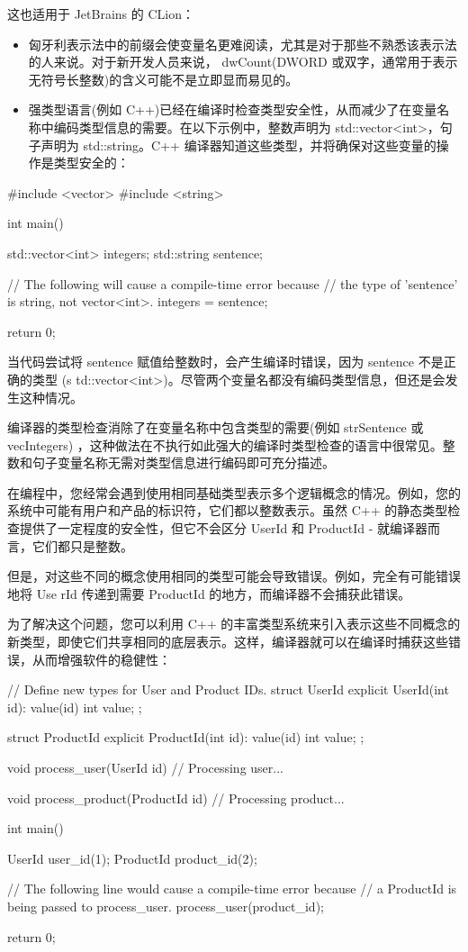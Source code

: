 这也适用于 JetBrains 的 CLion：

\begin{itemize}
\item
匈牙利表示法中的前缀会使变量名更难阅读，尤其是对于那些不熟悉该表示法的人来说。对于新开发人员来说， dwCount(DWORD 或双字，通常用于表示无符号长整数)的含义可能不是立即显而易见的。

\item
强类型语言(例如 C++)已经在编译时检查类型安全性，从而减少了在变量名称中编码类型信息的需要。在以下示例中，整数声明为 std::vector<int>，句子声明为 std::string。C++ 编译器知道这些类型，并将确保对这些变量的操作是类型安全的：
\end{itemize}

\begin{cpp}
#include <vector>
#include <string>

int main() {
    std::vector<int> integers;
    std::string sentence;

    // The following will cause a compile-time error because
    // the type of 'sentence' is string, not vector<int>.
    integers = sentence;

    return 0;
}
\end{cpp}

当代码尝试将 sentence 赋值给整数时，会产生编译时错误，因为 sentence 不是正确的类型 (s td::vector<int>)。尽管两个变量名都没有编码类型信息，但还是会发生这种情况。

编译器的类型检查消除了在变量名称中包含类型的需要(例如 strSentence 或 vecIntegers) ，这种做法在不执行如此强大的编译时类型检查的语言中很常见。整数和句子变量名称无需对类型信息进行编码即可充分描述。

在编程中，您经常会遇到使用相同基础类型表示多个逻辑概念的情况。例如，您的系统中可能有用户和产品的标识符，它们都以整数表示。虽然 C++ 的静态类型检查提供了一定程度的安全性，但它不会区分 UserId 和 ProductId - 就编译器而言，它们都只是整数。

但是，对这些不同的概念使用相同的类型可能会导致错误。例如，完全有可能错误地将 Use rId 传递到需要 ProductId 的地方，而编译器不会捕获此错误。

为了解决这个问题，您可以利用 C++ 的丰富类型系统来引入表示这些不同概念的新类型，即使它们共享相同的底层表示。这样，编译器就可以在编译时捕获这些错误，从而增强软件的稳健性：

\begin{cpp}
// Define new types for User and Product IDs.
struct UserId {
    explicit UserId(int id): value(id) {}
    int value;
};

struct ProductId {
    explicit ProductId(int id): value(id) {}
    int value;
};

void process_user(UserId id) {
    // Processing user...
}

void process_product(ProductId id) {
    // Processing product...
}

int main() {
    UserId user_id(1);
    ProductId product_id(2);

    // The following line would cause a compile-time error because
    // a ProductId is being passed to process_user.
    process_user(product_id);

    return 0;
}
\end{cpp}

